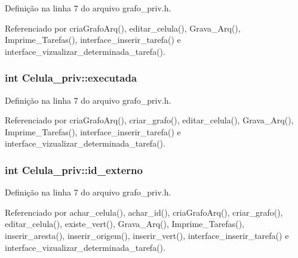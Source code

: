 Definição na linha 7 do arquivo grafo\+\_\+priv.\+h.



Referenciado por cria\+Grafo\+Arq(), editar\+\_\+celula(), Grava\+\_\+\+Arq(), Imprime\+\_\+\+Tarefas(), interface\+\_\+inserir\+\_\+tarefa() e interface\+\_\+vizualizar\+\_\+determinada\+\_\+tarefa().

\hypertarget{structCelula__priv_af5f995caad41372e844f965021c5d183}{}
\subsubsection[{executada}]{\setlength{\rightskip}{0pt plus 5cm}int Celula\+\_\+priv\+::executada}\label{structCelula__priv_af5f995caad41372e844f965021c5d183}


Definição na linha 7 do arquivo grafo\+\_\+priv.\+h.



Referenciado por cria\+Grafo\+Arq(), criar\+\_\+grafo(), editar\+\_\+celula(), Grava\+\_\+\+Arq(), Imprime\+\_\+\+Tarefas(), interface\+\_\+inserir\+\_\+tarefa() e interface\+\_\+vizualizar\+\_\+determinada\+\_\+tarefa().

\hypertarget{structCelula__priv_a78a8525da28e1918d0faaf127001bd7b}{}
\subsubsection[{id\+\_\+externo}]{\setlength{\rightskip}{0pt plus 5cm}int Celula\+\_\+priv\+::id\+\_\+externo}\label{structCelula__priv_a78a8525da28e1918d0faaf127001bd7b}


Definição na linha 7 do arquivo grafo\+\_\+priv.\+h.



Referenciado por achar\+\_\+celula(), achar\+\_\+id(), cria\+Grafo\+Arq(), criar\+\_\+grafo(), editar\+\_\+celula(), existe\+\_\+vert(), Grava\+\_\+\+Arq(), Imprime\+\_\+\+Tarefas(), inserir\+\_\+aresta(), inserir\+\_\+origem(), inserir\+\_\+vert(), interface\+\_\+inserir\+\_\+tarefa() e interface\+\_\+vizualizar\+\_\+determinada\+\_\+tarefa().

\hypertarget{structCelula__priv_a3c49601fe078bd7bb1512f0107af5301}{}
